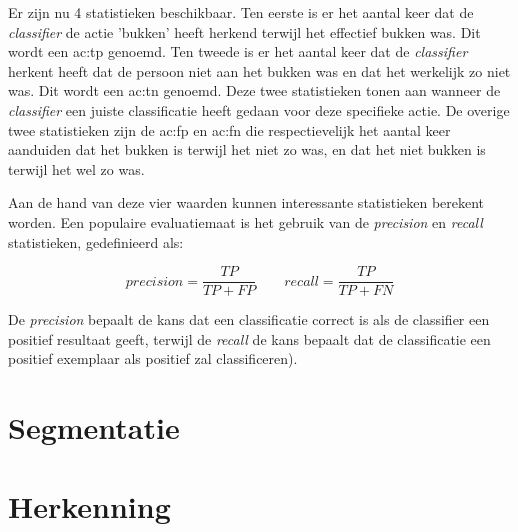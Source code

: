 Er zijn nu 4 statistieken beschikbaar. Ten eerste is er het aantal keer dat de \textit{classifier} de actie 'bukken' heeft herkend terwijl het effectief bukken was. Dit wordt een \gls{ac:tp} genoemd. Ten tweede is er het aantal keer dat de \textit{classifier} herkent heeft dat de persoon niet aan het bukken was en dat het werkelijk zo niet was. Dit wordt een \gls{ac:tn} genoemd. Deze twee statistieken tonen aan wanneer de \textit{classifier} een juiste classificatie heeft gedaan voor deze specifieke actie. De overige twee statistieken zijn de \gls{ac:fp} en \gls{ac:fn} die respectievelijk het aantal keer aanduiden dat het bukken is terwijl het niet zo was, en dat het niet bukken is terwijl het wel zo was. 

Aan de hand van deze vier waarden kunnen interessante statistieken berekent worden. Een populaire evaluatiemaat is het gebruik van de \textit{precision} en \textit{recall} statistieken, gedefinieerd als:

$$precision = \frac{TP}{TP + FP} \qquad recall = \frac{TP}{TP + FN}$$

De \textit{precision} bepaalt de kans dat een classificatie correct is als de classifier een positief resultaat geeft, terwijl de \textit{recall} de kans bepaalt dat de classificatie een positief exemplaar als positief zal classificeren).



\section{Segmentatie}



\section{Herkenning}